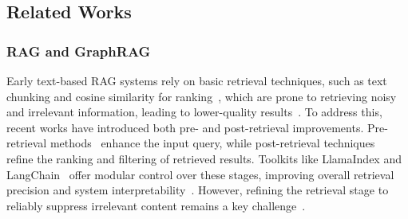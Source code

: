 

\subsection{Related Works}
\label{section: rw}

\subsubsection{RAG and GraphRAG}
Early text-based RAG systems rely on basic retrieval techniques, such as text chunking and cosine similarity for ranking~\cite{lewis2021retrieval}, which are prone to retrieving noisy and irrelevant information, leading to lower-quality results~\cite{HyDE}. To address this, recent works have 
introduced both pre- and post-retrieval improvements. 
Pre-retrieval methods~\cite{StepBackRAG} enhance the input query, 
while post-retrieval techniques~\cite{G-RAG, R4} refine the ranking and filtering of retrieved results. 
Toolkits like LlamaIndex and LangChain~\cite{LlamaIndex, LangChain} offer modular control over these stages, improving overall retrieval precision and system interpretability~\cite{HyDE}.
However, refining the retrieval stage to reliably suppress irrelevant content remains a key challenge~\cite{GraphRAG}. 

